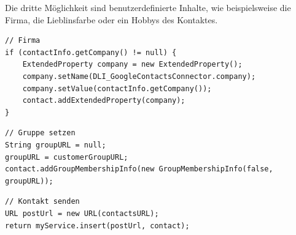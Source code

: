 Die dritte Möglichkeit sind benutzerdefinierte Inhalte, wie beispielsweise die Firma, die
 Lieblinsfarbe oder ein Hobbys des Kontaktes.

\begin{lstlisting}[float=h!t]
// Firma
if (contactInfo.getCompany() != null) {
	ExtendedProperty company = new ExtendedProperty();
	company.setName(DLI_GoogleContactsConnector.company);
	company.setValue(contactInfo.getCompany());
	contact.addExtendedProperty(company);
}
\end{lstlisting}

\begin{lstlisting}[float=h!t]
// Gruppe setzen
String groupURL = null;
groupURL = customerGroupURL;
contact.addGroupMembershipInfo(new GroupMembershipInfo(false, groupURL));
\end{lstlisting}

\begin{lstlisting}[float=h!t]
// Kontakt senden		
URL postUrl = new URL(contactsURL);
return myService.insert(postUrl, contact);
\end{lstlisting}
\FloatBarrier
